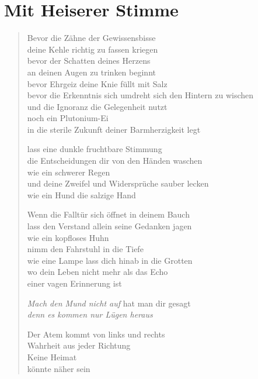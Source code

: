 

\cleartoverso

\section{Mit Heiserer Stimme}

\begin{verse}

Bevor die Zähne der Gewissensbisse\\
deine Kehle richtig zu fassen kriegen\\
bevor der Schatten deines Herzens\\
an deinen Augen zu trinken beginnt\\
bevor Ehrgeiz deine Knie füllt mit Salz\\
bevor die Erkenntnis sich umdreht sich den Hintern zu wischen\\
und die Ignoranz die Gelegenheit nutzt\\
noch ein Plutonium-Ei\\
in die sterile Zukunft deiner Barmherzigkeit legt

lass eine dunkle fruchtbare Stimmung\\
die Entscheidungen dir von den Händen waschen\\
wie ein schwerer Regen\\
und deine Zweifel und Widersprüche sauber lecken\\
wie ein Hund die salzige Hand

Wenn die Falltür sich öffnet in deinem Bauch\\
lass den Verstand allein seine Gedanken jagen\\
wie ein kopfloses Huhn\\
nimm den Fahrstuhl in die Tiefe\\
wie eine Lampe lass dich hinab in die Grotten\\
wo dein Leben nicht mehr als das Echo\\
einer vagen Erinnerung ist

\clearpage

\emph{Mach den Mund nicht auf} hat man dir gesagt\\
\emph{denn es kommen nur Lügen heraus}

Der Atem kommt von links und rechts\\
Wahrheit aus jeder Richtung\\
Keine Heimat\\
könnte näher sein

\end{verse}

